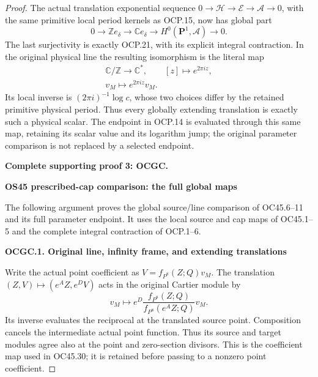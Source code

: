 \begin{proof}
The actual translation exponential sequence
\(0\to\mathscr H\to\mathscr E\to\mathscr A\to0\), with the
same primitive local period kernels as OCP.15, now has global part
\[
0\longrightarrow\mathbb Ze_\delta
\longrightarrow\mathbb Ce_\delta
\longrightarrow H^0(\mathbf P^1,\mathscr A)
\longrightarrow0.
\tag{OCP.22}
\]
The last surjectivity is exactly OCP.21, with its explicit integral
contraction. In the original physical line the resulting isomorphism
is the literal map
\[
\begin{gathered}
\mathbb C/\mathbb Z\longrightarrow\mathbb C^*,
\qquad [z]\longmapsto e^{2\pi i z},\\
v_M\longmapsto e^{2\pi i z}v_M.
\end{gathered}
\tag{OCP.23}
\]
Its local inverse is \((2\pi i)^{-1}\log c\), whose two choices differ
by the retained primitive physical period. Thus every globally
extending translation is exactly such a physical scalar. The endpoint
in OCP.14 is evaluated through this same map, retaining its scalar
value and its logarithm jump; the original parameter comparison is
not replaced by a selected endpoint.



\par\bigskip\noindent\textbf{Complete supporting proof 3: OCGC.}\par


\par

\medskip\noindent\textbf{OS45 prescribed-cap comparison: the full global maps}

\par\nobreak

The following argument proves the global source/line
comparison of OC45.6--11 and its full parameter endpoint.
It uses the local source and cap maps of OC45.1--5 and
the complete integral contraction of OCP.1--6.

\par

\medskip\noindent\textbf{OCGC.1. Original line, infinity frame, and extending translations}

\par\nobreak

Write the actual point coefficient as \(V=f_{P^8}(Z;Q)v_M\).
The translation \((Z,V)\mapsto(e^A Z,e^D V)\) acts in the original
Cartier module by
\[
v_M\longmapsto e^D\frac{f_{P^8}(Z;Q)}{f_{P^8}(e^A Z;Q)}v_M.
\tag{OCGC.1}
\]
Its inverse evaluates the reciprocal at the translated source point.
Composition cancels the intermediate actual point function. Thus its
source and target modules agree also at the point and zero-section
divisors. This is the coefficient map used in OC45.30; it is retained
before passing to a nonzero point coefficient.


\end{proof}
